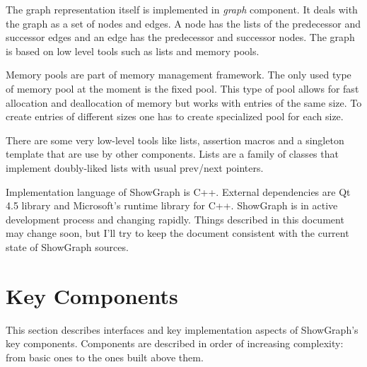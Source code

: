 \documentclass[11pt,twoside,a4paper]{article}
\begin{document}
The graph representation itself is implemented in \emph{graph} component. It deals with the graph as a set of nodes and edges. A node has the lists of the predecessor and successor edges and an edge has the predecessor and successor nodes. The graph is based on low level tools such as lists and memory pools.

Memory pools are part of memory management framework. The only used type of memory pool at the moment is the fixed pool. This type of pool allows for fast allocation and deallocation of memory but works with entries of the same size. To create entries of different sizes one has to create specialized pool for each size.

There are some very low-level tools like lists, assertion macros and a singleton template that are use by other components. Lists are a family of classes that implement doubly-liked lists with usual prev/next pointers. 

Implementation language of ShowGraph is C++. External dependencies are Qt 4.5 library and Microsoft's runtime library for C++. ShowGraph is in active development process and changing rapidly. Things described in this document may change soon, but I'll try to keep the document consistent with the current state of ShowGraph sources.

\section{Key Components}
This section describes interfaces and key implementation aspects of ShowGraph's key components. Components are described in order of increasing complexity: from basic ones to the ones built above them.
\end{document}
